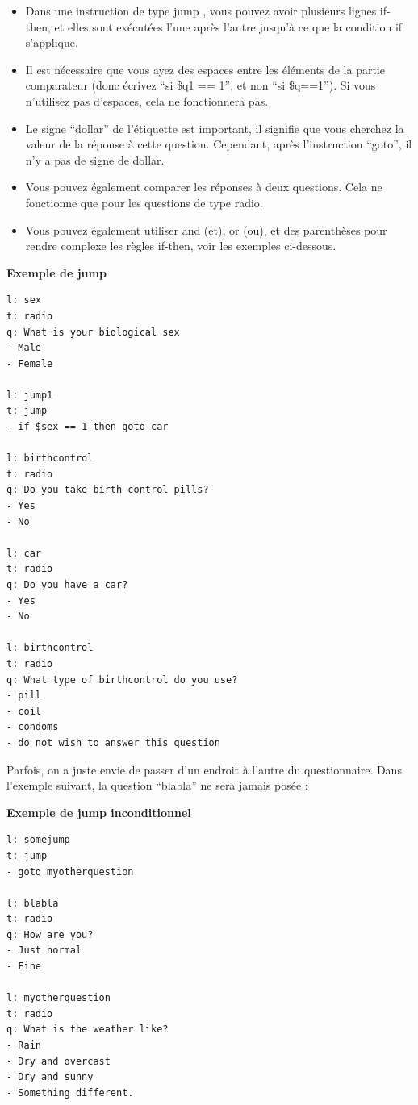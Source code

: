 \documentclass[
]{book}
\providecommand{\tightlist}{%
  \setlength{\itemsep}{0pt}\setlength{\parskip}{0pt}}
\begin{document}
\begin{itemize}
\tightlist
\item
  Dans une instruction de type jump , vous pouvez avoir plusieurs lignes
  if-then, et elles sont exécutées l'une après l'autre jusqu'à ce que la
  condition if s'applique.
\item
  Il est nécessaire que vous ayez des espaces entre les éléments de la
  partie comparateur (donc écrivez ``si \$q1 == 1'', et non ``si
  \$q==1''). Si vous n'utilisez pas d'espaces, cela ne fonctionnera pas.
\item
  Le signe ``dollar'' de l'étiquette est important, il signifie que vous
  cherchez la valeur de la réponse à cette question. Cependant, après
  l'instruction ``goto'', il n'y a pas de signe de dollar.
\item
  Vous pouvez également comparer les réponses à deux questions. Cela ne
  fonctionne que pour les questions de type radio.
\item
  Vous pouvez également utiliser and (et), or (ou), et des parenthèses
  pour rendre complexe les règles if-then, voir les exemples ci-dessous.
\end{itemize}

\textbf{Exemple de jump}

\begin{verbatim}
l: sex
t: radio
q: What is your biological sex
- Male
- Female

l: jump1
t: jump
- if $sex == 1 then goto car

l: birthcontrol
t: radio
q: Do you take birth control pills?
- Yes
- No

l: car
t: radio
q: Do you have a car?
- Yes
- No

l: birthcontrol
t: radio
q: What type of birthcontrol do you use?
- pill
- coil
- condoms
- do not wish to answer this question
\end{verbatim}

Parfois, on a juste envie de passer d'un endroit à l'autre du
questionnaire. Dans l'exemple suivant, la question ``blabla'' ne sera
jamais posée :

\textbf{Exemple de jump inconditionnel}

\begin{verbatim}
l: somejump
t: jump
- goto myotherquestion

l: blabla
t: radio
q: How are you?
- Just normal
- Fine

l: myotherquestion
t: radio
q: What is the weather like?
- Rain
- Dry and overcast
- Dry and sunny
- Something different.
\end{verbatim}
\end{document}
